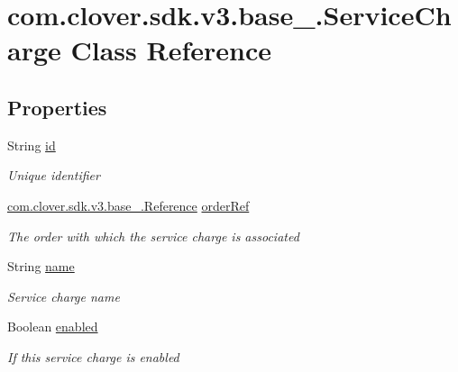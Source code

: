 \hypertarget{classcom_1_1clover_1_1sdk_1_1v3_1_1base___1_1_service_charge}{}\section{com.\+clover.\+sdk.\+v3.\+base\+\_\+.\+Service\+Charge Class Reference}
\label{classcom_1_1clover_1_1sdk_1_1v3_1_1base___1_1_service_charge}
\subsection*{Properties}
\begin{DoxyCompactItemize}
\item 
String \hyperlink{classcom_1_1clover_1_1sdk_1_1v3_1_1base___1_1_service_charge_a504edc97bca630549b23526100d4ac2c}{id}
\begin{DoxyCompactList}\small\item\em Unique identifier \end{DoxyCompactList}\item 
\hyperlink{classcom_1_1clover_1_1sdk_1_1v3_1_1base___1_1_reference}{com.\+clover.\+sdk.\+v3.\+base\+\_\+.\+Reference} \hyperlink{classcom_1_1clover_1_1sdk_1_1v3_1_1base___1_1_service_charge_a6dfa5493c5841e67ebd02d5c53a534b9}{order\+Ref}
\begin{DoxyCompactList}\small\item\em The order with which the service charge is associated \end{DoxyCompactList}\item 
String \hyperlink{classcom_1_1clover_1_1sdk_1_1v3_1_1base___1_1_service_charge_a6e73b9d817947761ac9adea4b2d0e03d}{name}
\begin{DoxyCompactList}\small\item\em Service charge name \end{DoxyCompactList}\item 
Boolean \hyperlink{classcom_1_1clover_1_1sdk_1_1v3_1_1base___1_1_service_charge_a2d02f322285cfcddbf0efca36767f951}{enabled}
\begin{DoxyCompactList}\small\item\em If this service charge is enabled \end{DoxyCompactList}\item 

\end{DoxyCompactItemize}
